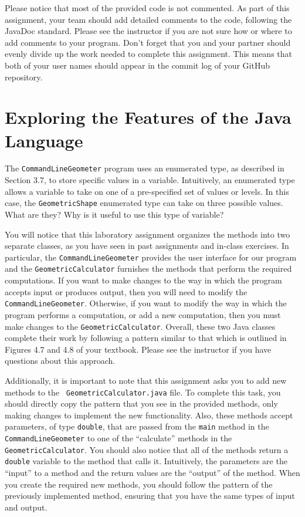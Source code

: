 \documentclass[11pt]{article}
\begin{document}
Please notice that most of the provided code is not commented. As part of this assignment, your team should add
detailed comments to the code, following the JavaDoc standard. Please see the instructor if you are not sure how or
where to add comments to your program. Don't forget that you and your partner should evenly divide up the work needed to
complete this assignment. This means that both of your user names should appear in the commit log of your GitHub
repository.

\section*{Exploring the Features of the Java Language}

The {\tt CommandLineGeometer} program uses an enumerated type, as described in Section 3.7, to store specific values in
a variable. Intuitively, an enumerated type allows a variable to take on one of a pre-specified set of values or levels.
In this case, the {\tt GeometricShape} enumerated type can take on three possible values. What are they? Why is it
useful to use this type of variable?

You will notice that this laboratory assignment organizes the methods into two separate classes, as you have seen in
past assignments and in-class exercises. In particular, the {\tt CommandLineGeometer} provides the user interface for
our program and the {\tt GeometricCalculator} furnishes the methods that perform the required computations.  If you want
to make changes to the way in which the program accepts input or produces output, then you will need to modify the {\tt
CommandLineGeometer}. Otherwise, if you want to modify the way in which the program performs a computation, or add a new
computation, then you must make changes to the {\tt GeometricCalculator}. Overall, these two Java classes complete their
work by following a pattern similar to that which is outlined in Figures 4.7 and 4.8 of your textbook. Please see the
instructor if you have questions about this approach.

Additionally, it is important to note that this assignment asks you to add new methods to the {\tt
GeometricCalculator.java} file. To complete this task, you should directly copy the pattern that you see in the
provided methods, only making changes to implement the new functionality. Also, these methods accept parameters, of
type {\tt double}, that are passed from the {\tt main} method in the {\tt CommandLineGeometer} to one of the
``calculate'' methods in the {\tt GeometricCalculator}. You should also notice that all of the methods return a {\tt
double} variable to the method that calls it. Intuitively, the parameters are the ``input'' to a method and the return
values are the ``output'' of the method. When you create the required new methods, you should follow the pattern of the
previously implemented method, ensuring that you have the same types of input and output.
\end{document}
